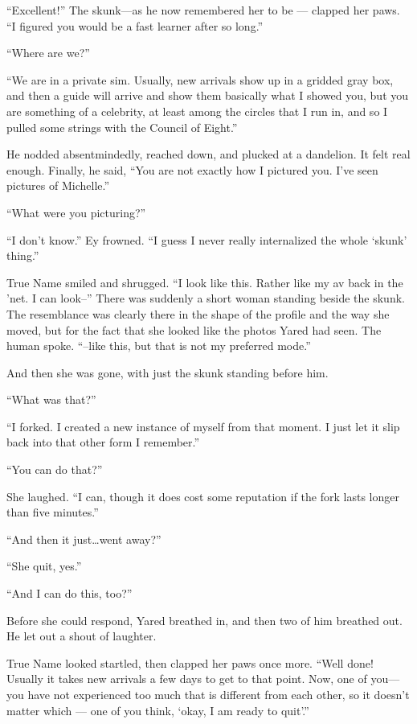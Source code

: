 ``Excellent!'' The skunk---as he now remembered her to be — clapped her paws. ``I figured you would be a fast learner after so long.''

``Where are we?''

``We are in a private sim. Usually, new arrivals show up in a gridded gray box, and then a guide will arrive and show them basically what I showed you, but you are something of a celebrity, at least among the circles that I run in, and so I pulled some strings with the Council of Eight.''

He nodded absentmindedly, reached down, and plucked at a dandelion. It felt real enough. Finally, he said, ``You are not exactly how I pictured you. I've seen pictures of Michelle.''

``What were you picturing?''

``I don't know.'' Ey frowned. ``I guess I never really internalized the whole `skunk' thing.''

True Name smiled and shrugged. ``I look like this. Rather like my av back in the 'net. I can look--'' There was suddenly a short woman standing beside the skunk. The resemblance was clearly there in the shape of the profile and the way she moved, but for the fact that she looked like the photos Yared had seen. The human spoke. ``--like this, but that is not my preferred mode.''

And then she was gone, with just the skunk standing before him.

``What was that?''

``I forked. I created a new instance of myself from that moment. I just let it slip back into that other form I remember.''

``You can do that?''

She laughed. ``I can, though it does cost some reputation if the fork lasts longer than five minutes.''

``And then it just\ldots went away?''

``She quit, yes.''

``And I can do this, too?''

Before she could respond, Yared breathed in, and then two of him breathed out. He let out a shout of laughter.

True Name looked startled, then clapped her paws once more. ``Well done! Usually it takes new arrivals a few days to get to that point. Now, one of you---you have not experienced too much that is different from each other, so it doesn't matter which — one of you think, `okay, I am ready to quit'.''

